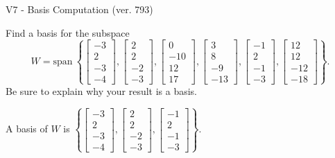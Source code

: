 \begin{exercise}
  \begin{exerciseTitle}V7 - Basis Computation (ver. 793)\end{exerciseTitle}
  \begin{exerciseStatement}
    Find a basis for the subspace 
\[W=\mathrm{span}\ \left\{\left[\begin{array}{r}
-3 \\
2 \\
-3 \\
-4
\end{array}\right] , \left[\begin{array}{r}
2 \\
2 \\
-2 \\
-3
\end{array}\right] , \left[\begin{array}{r}
0 \\
-10 \\
12 \\
17
\end{array}\right] , \left[\begin{array}{r}
3 \\
8 \\
-9 \\
-13
\end{array}\right] , \left[\begin{array}{r}
-1 \\
2 \\
-1 \\
-3
\end{array}\right] , \left[\begin{array}{r}
12 \\
12 \\
-12 \\
-18
\end{array}\right]\right\}.\]
 Be sure to explain why your result is a basis.


  \end{exerciseStatement}
  \begin{exerciseAnswer}
   A basis of \(W\) is  \(\left\{\left[\begin{array}{r}
-3 \\
2 \\
-3 \\
-4
\end{array}\right] , \left[\begin{array}{r}
2 \\
2 \\
-2 \\
-3
\end{array}\right] , \left[\begin{array}{r}
-1 \\
2 \\
-1 \\
-3
\end{array}\right]\right\}\).
  


  \end{exerciseAnswer}
\end{exercise}